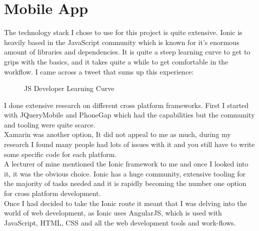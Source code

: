   \section{Mobile App} %
The technology stack I chose to use for this project is quite extensive.  
Ionic is heavily based in the JavaScript community which is known for it's enormous amount of libraries and dependencies.
It is quite a steep learning curve to get to grips with the basics, and it takes quite a while to get comfortable in the workflow.
I came across a tweet that sums up this experience:
\begin{figure}[H] 
	\caption{JS Developer Learning Curve}
	\label{fig:speciation}
\end{figure}


I  done extensive research on different cross platform frameworks.
First I started with JQueryMobile and PhoneGap which had the capabilities but the community and tooling were quite scarce. 
\\ 

Xamarin was another option, It did not appeal to me as much, during my research I found many people had lots of issues with it and you still have to write some specific code for each platform.
\\ 

A lecturer of mine mentioned the Ionic framework to me and once I looked into it, it was the obvious choice.
Ionic has a huge community, extensive tooling for the majority of tasks needed and it is rapidly becoming the number one option for cross platform development.
\\

Once I had decided to take the Ionic route it meant that I was delving into the world of web development, as Ionic uses AngularJS, which is used with JavaScript, HTML, CSS and all the web development tools and work-flows.

